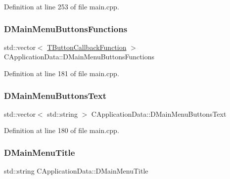 Definition at line 253 of file main.\+cpp.

\hypertarget{classCApplicationData_a9f9c3de6840e902711636257640a8e91}{}\label{classCApplicationData_a9f9c3de6840e902711636257640a8e91} 
\subsubsection{\texorpdfstring{D\+Main\+Menu\+Buttons\+Functions}{DMainMenuButtonsFunctions}}
{\footnotesize\ttfamily std\+::vector$<$ \hyperlink{main_8cpp_af91bc223ea3fea871af009bfef33c595}{T\+Button\+Callback\+Function} $>$ C\+Application\+Data\+::\+D\+Main\+Menu\+Buttons\+Functions\hspace{0.3cm}{\ttfamily [protected]}}



Definition at line 181 of file main.\+cpp.

\hypertarget{classCApplicationData_a1e1c9f4434847c50210c0b36ff475f78}{}\label{classCApplicationData_a1e1c9f4434847c50210c0b36ff475f78} 
\subsubsection{\texorpdfstring{D\+Main\+Menu\+Buttons\+Text}{DMainMenuButtonsText}}
{\footnotesize\ttfamily std\+::vector$<$ std\+::string $>$ C\+Application\+Data\+::\+D\+Main\+Menu\+Buttons\+Text\hspace{0.3cm}{\ttfamily [protected]}}



Definition at line 180 of file main.\+cpp.

\hypertarget{classCApplicationData_a2b0ca036562d2af6eca3ee4a6e2330f8}{}\label{classCApplicationData_a2b0ca036562d2af6eca3ee4a6e2330f8} 
\subsubsection{\texorpdfstring{D\+Main\+Menu\+Title}{DMainMenuTitle}}
{\footnotesize\ttfamily std\+::string C\+Application\+Data\+::\+D\+Main\+Menu\+Title\hspace{0.3cm}{\ttfamily [protected]}}



